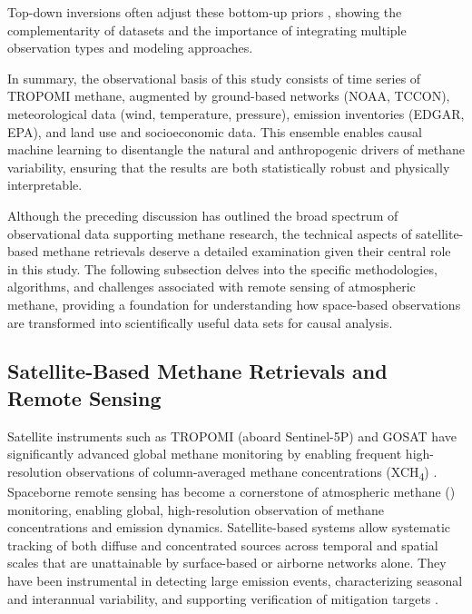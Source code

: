 Top-down inversions often adjust these bottom-up priors \cite{Maasakkers2019, Saunois2020}, showing the complementarity of datasets and the importance of integrating multiple observation types and modeling approaches.

In summary, the observational basis of this study consists of time series of TROPOMI methane, augmented by ground-based networks (NOAA, TCCON), meteorological data (wind, temperature, pressure), emission inventories (EDGAR, EPA), and land use and socioeconomic data. This ensemble enables causal machine learning to disentangle the natural and anthropogenic drivers of methane variability, ensuring that the results are both statistically robust and physically interpretable.

Although the preceding discussion has outlined the broad spectrum of observational data supporting methane research, the technical aspects of satellite-based methane retrievals deserve a detailed examination given their central role in this study. The following subsection delves into the specific methodologies, algorithms, and challenges associated with remote sensing of atmospheric methane, providing a foundation for understanding how space-based observations are transformed into scientifically useful data sets for causal analysis.

\subsection{Satellite-Based Methane Retrievals and Remote Sensing}
\label{sec:satellite-retrievals}

Satellite instruments such as TROPOMI (aboard Sentinel-5P) and GOSAT have significantly advanced global methane monitoring by enabling frequent high-resolution observations of column-averaged methane concentrations (XCH\textsubscript{4}) \cite{Schneising2019, Lorente2021}. Spaceborne remote sensing has become a cornerstone of atmospheric methane () monitoring, enabling global, high-resolution observation of methane concentrations and emission dynamics. Satellite-based systems allow systematic tracking of both diffuse and concentrated sources across temporal and spatial scales that are unattainable by surface-based or airborne networks alone. They have been instrumental in detecting large emission events, characterizing seasonal and interannual variability, and supporting verification of mitigation targets \cite{eo_portal_iss_2023, ghgsat_ghgsat_2023, writer_methane_tracking_2023}.

